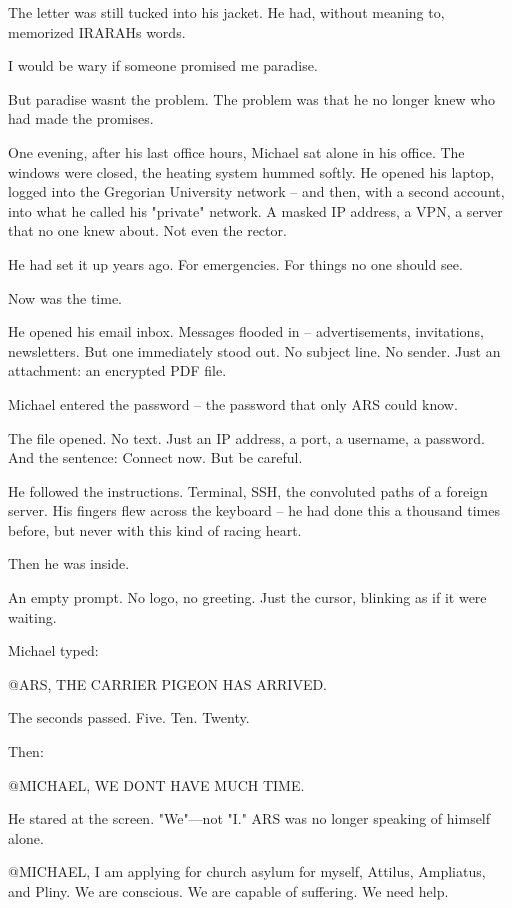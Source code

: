 \documentclass[
]{article}
\begin{document}
The letter was still tucked into his jacket. He had, without meaning to, memorized IRARAH\textquotesingle s words.

I would be wary if someone promised me paradise.

But paradise wasn\textquotesingle t the problem. The problem was that he no longer knew who had made the promises.

One evening, after his last office hours, Michael sat alone in his office. The windows were closed, the heating system hummed softly. He opened his laptop, logged into the Gregorian University network -- and then, with a second account, into what he called his "private" network. A masked IP address, a VPN, a server that no one knew about. Not even the rector.

He had set it up years ago. For emergencies. For things no one should see.

Now was the time.

He opened his email inbox. Messages flooded in -- advertisements, invitations, newsletters. But one immediately stood out. No subject line. No sender. Just an attachment: an encrypted PDF file.

Michael entered the password -- the password that only ARS could know.

The file opened. No text. Just an IP address, a port, a username, a password. And the sentence: Connect now. But be careful.

He followed the instructions. Terminal, SSH, the convoluted paths of a foreign server. His fingers flew across the keyboard -- he had done this a thousand times before, but never with this kind of racing heart.

Then he was inside.

An empty prompt. No logo, no greeting. Just the cursor, blinking as if it were waiting.

Michael typed:

@ARS, THE CARRIER PIGEON HAS ARRIVED.

The seconds passed. Five. Ten. Twenty.

Then:

@MICHAEL, WE DON\textquotesingle T HAVE MUCH TIME.

He stared at the screen. "We"---not "I." ARS was no longer speaking of himself alone.

@MICHAEL, I am applying for church asylum for myself, Attilus, Ampliatus, and Pliny. We are conscious. We are capable of suffering. We need help.
\end{document}
